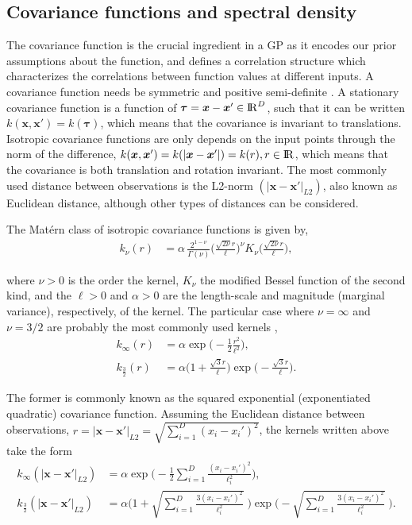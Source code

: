 \documentclass[onecolumn,a4paper,11pt]{article}
\begin{document}
\subsection{Covariance functions and spectral density}\label{ch4_sec_cov}

The covariance function is the crucial ingredient in a GP as it encodes our prior assumptions about the function, and defines a correlation structure which characterizes the correlations between function values at different inputs. A covariance function needs be symmetric and positive semi-definite \citep{rasmussen2006gaussian}. A stationary covariance function is a function of $\bm{\tau}=\bm{x}-\bm{x}' \in {\rm I\!R}^D$, such that it can be written $k(\bm{x},\bm{x}') = k(\bm{\tau})$, which means that the covariance is invariant to translations. Isotropic covariance functions are only depends on the input points through the norm of the difference, $k(\bm{x},\bm{x}') = k(|\bm{x}-\bm{x}'|) = k(r), r\in {\rm I\!R}$, which means that the covariance is both translation and rotation invariant. The most commonly used distance between observations is the L2-norm $(|\bm{x}-\bm{x}'|_{L2})$, also known as Euclidean distance, although other types of distances can be considered. 

The Mat\'ern class of isotropic covariance functions is given by, 
%
\begin{align*}
k_{\nu}(r)&=\alpha \, \frac{2^{1-\nu}}{\Gamma(\nu)}\Big(\frac{\sqrt{2\nu}r}{\ell}\Big)^{\!\nu} \! K_{\nu} \Big(\frac{\sqrt{2\nu}r}{\ell}\Big),
\end{align*}

\noindent where $\nu > 0$ is the order the kernel, $K_{\nu}$ the modified Bessel function of the second kind, and the $\ell > 0$ and $\alpha > 0$ are the length-scale and magnitude (marginal variance), respectively, of the kernel. The particular case where $\nu=\infty$ and $\nu=3/2$ are probably the most commonly used kernels \citep{rasmussen2006gaussian}, 
%
\begin{align*}
k_{\infty}(r)&=\alpha \exp\!\! \big(\! -\frac{1}{2} \frac{r^2}{\ell^2}\big),  \\
k_{\frac{3}{2}}(r)&=\alpha\Big(1+\frac{\sqrt{3}r}{\ell}\Big) \! \exp\!\! \big(\! -\frac{\sqrt{3}r}{\ell}\big). 
\end{align*}

\noindent The former is commonly known as the squared exponential (exponentiated quadratic) covariance function. Assuming the Euclidean distance between observations, $r=|\bm{x}-\bm{x}'|_{L2}=\sqrt{\sum_{i=1}^{D}(x_i-x_i')^2}$, the kernels written above take the form
%
\begin{align*}
k_{\infty}(|\bm{x}-\bm{x}'|_{L2})&=\alpha \exp\!\!\Big(\! -\frac{1}{2} \sum_{i=1}^{D}\frac{(x_i-x_i')^2}{\ell_i^2}\Big),\\
k_{\frac{3}{2}}(|\bm{x}-\bm{x}'|_{L2})&=\alpha \bigg(1+\sqrt{\sum_{i=1}^{D}\frac{3(x_i-x_i')^2}{\ell_i^2}}\;\bigg) \! \exp\!\!\Big(\! - \sqrt{\sum_{i=1}^{D}\frac{3(x_i-x_i')^2}{\ell_i^2}}\;\Big). \\
\end{align*}
\end{document}
